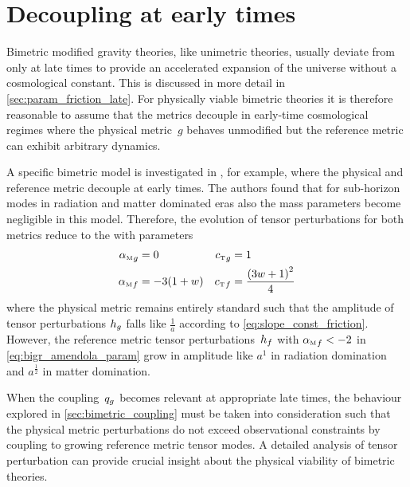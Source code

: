 \documentclass[12pt,parskip=half]{scrreprt}
\begin{document}


\section{Decoupling at early times}

Bimetric modified gravity theories, like unimetric theories, usually deviate from \LCDM only at late times to provide an accelerated expansion of the universe without a cosmological constant.  This is discussed in more detail in \autoref{sec:param_friction_late}. For physically viable bimetric theories it is therefore reasonable to assume that the metrics decouple in early-time cosmological regimes where the physical metric~\(g\) behaves unmodified but the reference metric can exhibit arbitrary dynamics.

A specific bimetric model is investigated in \cite{Amendola2015}, for example, where the physical and reference metric decouple at early times. The authors found that for sub-horizon modes in radiation and matter dominated eras also the mass parameters become negligible in this model. Therefore, the evolution of tensor perturbations for both metrics reduce to the  with parameters \citep{Amendola2015}
\begin{subequations}
\begin{align}
	\alphaMofmetr{g} &= 0 & \cTofmetr{g} &= 1 \\
	\alphaMofmetr{f} &= -3(1+\eosp) & \cTofmetr{f} &= \frac{\del{3\eosp + 1}^2}{4} \label{eq:bigr_amendola_param}
\end{align}
\end{subequations}
where the physical metric remains entirely standard such that the amplitude of tensor perturbations \(h_{g}\) falls like \(\frac{1}{a}\) according to \eqref{eq:slope_const_friction}. However, the reference metric tensor perturbations~\(h_{f}\) with \({\alpha_{\textnormal{\tiny{M}}}}_{f}<-2\) in \eqref{eq:bigr_amendola_param} grow in amplitude like \(a^1\) in radiation domination and \(a^\frac{1}{2}\) in matter domination.

When the coupling~\(q_{g}\) becomes relevant at appropriate late times, the behaviour explored in \autoref{sec:bimetric_coupling} must be taken into consideration such that the physical metric perturbations do not exceed observational constraints by coupling to growing reference metric tensor modes. A detailed analysis of tensor perturbation can provide crucial insight about the physical viability of bimetric theories. 
\end{document}
